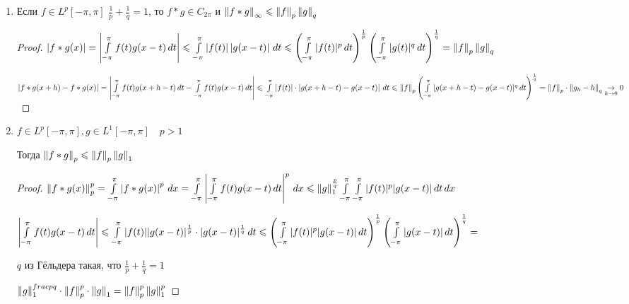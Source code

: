 \begin{consequences}
\begin{enumerate}
\begin{proof}
		\end{proof}
		
		\item
		Если $f\in L^p[-\pi, \pi]\,\,\frac{1}{p} + \frac{1}{q} = 1$, то $f*g \in C_{2\pi}$ и $\left\|f*g\right\|_\infty \leqslant \left\|f\right\|_p\left\|g\right\|_q $
		
		\begin{proof}\thmslashn
			
			$\left|f*g(x)\right| = \left|\int\limits_{-\pi}^\pi  f(t) g(x - t) \, dt\right| \leqslant \int\limits_{-\pi}^\pi \left|f(t)\right|\left|g(x - t)\right|\,dt \leqslant \left(\int\limits_{-\pi}^\pi  |f(t)|^p\,dt \right)^{\frac{1}{p}} \left(\int\limits_{-\pi}^\pi  |g(t)|^q\,dt \right)^{\frac{1}{q}} = \left\|f\right\|_p\left\|g\right\|_q$
			
			$\left|f*g(x + h) - f*g(x)\right| = \left|\int\limits_{-\pi}^\pi  f(t) g(x + h - t) \, dt - \int\limits_{-\pi}^\pi  f(t) g(x - t) \, dt\right| \leqslant \int\limits_{-\pi}^\pi  \left|f(t)\right|\cdot \left|g(x + h - t) - g(x - t)\right|  \, dt \leqslant \left\|f\right\|_p \left( \int\limits_{-\pi}^\pi |g(x + h - t) - g(x - t)|^q\,dt \right)^\frac{1}{q} = \left\|f\right\|_p\cdot\left\|g_h - h\right\|_q \underset{h\to 0}\to 0$
			
		\end{proof}
	
		\item
		$f \in L^p[-\pi, \pi], g \in L^1[-\pi, \pi]\quad p > 1$
		
		Тогда $\left\|f * g\right\|_p \leqslant \left\|f\right\|_p\left\|g\right\|_1$
		
		\begin{proof}\thmslashn
			
			$\left\|f*g(x)\right\|^p_p = \int\limits_{-\pi}^\pi  \left|f*g(x)\right|^p \, dx = \int\limits_{-\pi}^\pi \left| \int\limits_{-\pi}^\pi f(t) g(x - t)\,dt\right|^p\,dx \leqslant \left\|g\right\|_1^{\frac{p}{q}}  \int\limits_{-\pi}^\pi \int\limits_{-\pi}^\pi |f(t)|^p|g(x - t)|\,dt\,dx$
			
			$\left| \int\limits_{-\pi}^\pi f(t) g(x - t)\,dt\right| \leqslant  \int\limits_{-\pi}^\pi |f(t)||g(x - t)|^{\frac{1}{p}}\cdot |g(x - t)|^{\frac{1}{q}}\,dt \leqslant \left(\int\limits_{-\pi}^\pi |f(t)|^p |g(x - t)|\,dt \right)^{\frac{1}{p}}\left(\int\limits_{-\pi}^\pi |g(x - t)|\,dt \right)^{\frac{1}{q}} = $
			
			$q$ из Гёльдера такая, что $\frac{1}{p} + \frac{1}{q} = 1$
			
			 $\left\|g\right\|^{frac{p}{q}}_1 \cdot\left\|f\right\|^p_p\cdot\left\|g\right\|_1 = \left\|f\right\|^p_p\left\|g\right\|^p_1$
			
		\end{proof}
		
	\end{enumerate}
	
\end{consequences}

